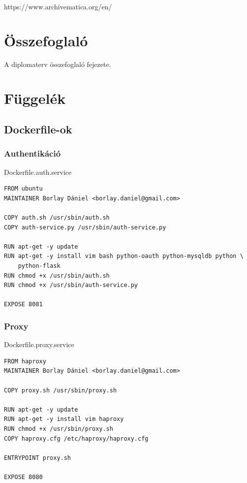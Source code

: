 \documentclass[11pt,magyar,a4paper,oneside,]{report}
\begin{document}
https://www.archivematica.org/en/

\chapter{Összefoglaló}\label{uxf6sszefoglaluxf3}

A diplomaterv összefoglaló fejezete.

\listoftables
\listoffigures




\appendix

\chapter{Függelék}\label{fuxfcggeluxe9k}

\section{Dockerfile-ok}\label{dockerfile-ok}

\subsection{Authentikáció}\label{authentikuxe1ciuxf3}

Dockerfile.auth.service

\begin{verbatim}
FROM ubuntu
MAINTAINER Borlay Dániel <borlay.daniel@gmail.com>

COPY auth.sh /usr/sbin/auth.sh
COPY auth-service.py /usr/sbin/auth-service.py

RUN apt-get -y update
RUN apt-get -y install vim bash python-oauth python-mysqldb python \
    python-flask
RUN chmod +x /usr/sbin/auth.sh
RUN chmod +x /usr/sbin/auth-service.py

EXPOSE 8081
\end{verbatim}

\subsection{Proxy}\label{proxy}

Dockerfile.proxy.service

\begin{verbatim}
FROM haproxy
MAINTAINER Borlay Dániel <borlay.daniel@gmail.com>

COPY proxy.sh /usr/sbin/proxy.sh

RUN apt-get -y update
RUN apt-get -y install vim haproxy
RUN chmod +x /usr/sbin/proxy.sh
COPY haproxy.cfg /etc/haproxy/haproxy.cfg

ENTRYPOINT proxy.sh

EXPOSE 8080
\end{verbatim}
\end{document}

